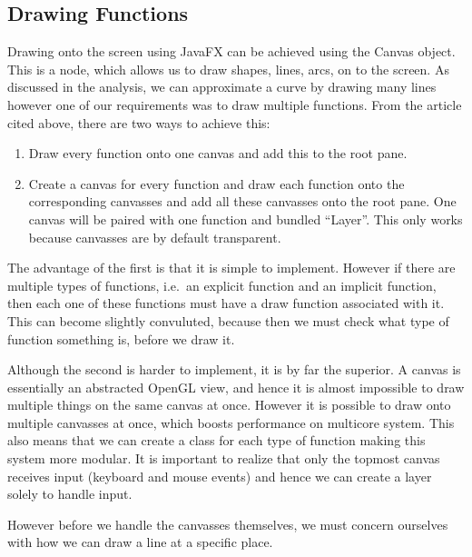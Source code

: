 \documentclass[../../../../../main.tex]{subfiles}
\begin{document}
\subsection{Drawing Functions}
Drawing onto the screen using JavaFX can be achieved using the Canvas\cite{canvas} object. This is a node, which allows us to draw shapes, lines, arcs, on to the screen. As discussed in the analysis, we can approximate a curve by drawing many lines however one of our requirements was to draw multiple functions. From the article cited above, there are two ways to achieve this:
\begin{enumerate}
	\item Draw every function onto one canvas and add this to the root pane.
	\item Create a canvas for every function and draw each function onto the corresponding canvasses and add all these canvasses onto the root pane. One canvas will be paired with one function and bundled ``Layer''. This only works because canvasses are by default transparent.
\end{enumerate}
The advantage of the first is that it is simple to implement. However if there are multiple types of functions, i.e.\ an explicit function and an implicit function, then each one of these functions must have a draw function associated with it. This can become slightly convuluted, because then we must check what type of function something is, before we draw it.

Although the second is harder to implement, it is by far the superior. A canvas is essentially an abstracted OpenGL view, and hence it is almost impossible\cite{openglMultithread} to draw multiple things on the same canvas at once. However it is possible to draw onto multiple canvasses at once, which boosts performance on multicore system. This also means that we can create a class for each type of function making this system more modular. It is important to realize that only the topmost canvas receives input (keyboard and mouse events) and hence we can create a layer solely to handle input.

However before we handle the canvasses themselves, we must concern ourselves with how we can draw a line at a specific place.
\end{document}
